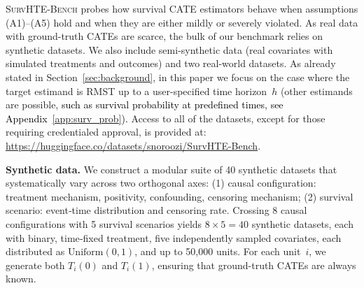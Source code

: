 \documentclass{article} %
\newcommand{\rebuttal}[1]{\textcolor{black}{#1}}
\begin{document}
\textsc{SurvHTE-Bench} probes how survival CATE estimators behave when assumptions (A1)--(A5) hold and when they are either mildly or severely violated.  As real data with ground-truth CATEs are scarce, the bulk of our benchmark relies on synthetic datasets. We also include semi-synthetic data (real covariates with simulated treatments and outcomes) and two real-world datasets. %
As already stated in Section~\ref{sec:background}, in this paper we focus on the case where the target estimand is RMST up to a user-specified time horizon~$h$ 
(other estimands are possible, 
\rebuttal{such as survival probability at predefined times, see Appendix~\ref{app:surv_prob}).}
Access to all of the datasets, except for those requiring credentialed approval, is provided at: \url{https://huggingface.co/datasets/snoroozi/SurvHTE-Bench}.





\textbf{Synthetic data.}
We construct a modular suite of 40 synthetic datasets that systematically vary across two orthogonal axes: (1) causal configuration: treatment mechanism, positivity, confounding, censoring mechanism; (2) survival scenario: event‑time distribution and censoring rate. 
Crossing 8 causal configurations with 5 survival scenarios yields $8\times5=40$ synthetic datasets, each with binary, time‑fixed treatment, five independently sampled covariates, each distributed as $\text{Uniform}(0,1)$, and up to 50{,}000 units. For each unit~$i$, we generate both $T_i(0)$ and $T_i(1)$, ensuring that ground-truth CATEs are always known. 
\end{document}
